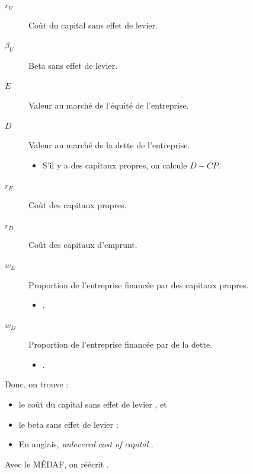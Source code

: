 \documentclass[10pt, french]{article}
\begin{document}
\begin{multicols*}{2}
\begin{definitionNOHFILLsub}
\begin{distributions}[Notation]
\begin{description}
	\item[$r_{U}$]	Coût du capital sans effet de levier.
	\item[$\beta_{U}$]	Beta sans effet de levier.
	\item[$E$]	Valeur au marché de l'équité de l'entreprise.
	\item[$D$]	Valeur au marché de la dette de l'entreprise.
		\begin{itemize}
		\item	S'il y a des capitaux propres, on calcule $D - CP$.
		\end{itemize}
	\item[$r_{E}$]	Coût des capitaux propres.
	\item[$r_{D}$]	Coût des capitaux d'emprunt.
	\item[$w_{E}$]	Proportion de l'entreprise financée par des capitaux propres.
		\begin{itemize}
		\item	{}.
		\end{itemize}
	\item[$w_{D}$]	Proportion de l'entreprise financée par de la dette.
		\begin{itemize}
		\item	{}.
		\end{itemize}
\end{description}
\end{distributions}

Donc, on trouve : 
\begin{itemize}
	\item	le coût du capital sans effet de levier , et 
	\item	le beta sans effet de levier  ;
	\item	En anglais, \og \textit{unlevered cost of capital} \fg{}.
\end{itemize}
\end{definitionNOHFILLsub}

\begin{definitionNOHFILLprop}
Avec le MÉDAF, on réécrit .\\
\end{definitionNOHFILLprop}


\end{multicols*}
\end{document}
